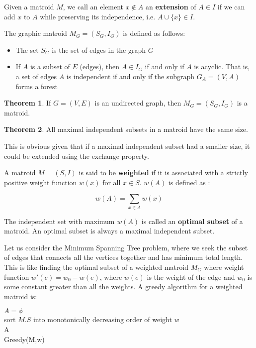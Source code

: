 \documentclass[12pt,letterpaper]{article}
\theoremstyle{definition}
\newtheorem{theorem}{Theorem}[section] %
\begin{document}
Given a matroid $M$, we call an element $x \notin A$ an \textbf{extension} of $A \in I$ if we can add $x$ to $A$ while preserving its independence, i.e. $A \cup \{x\} \in I$.

The graphic matroid $M_G = (S_G, I_G)$ is defined as follows:

\begin{itemize}
  \item The set $S_G$ is the set of edges in the graph $G$
  \item If $A$ is a subset of $E$ (edges), then $A \in I_G$ if and only if $A$ is acyclic. That is, a set of edges $A$ is independent if and only if the subgraph $G_A = (V,A)$ forms a forest
\end{itemize}

\begin{theorem}
  If $G = (V,E)$ is an undirected graph, then $M_G = (S_G,I_G)$ is a matroid.
\end{theorem}

\begin{theorem}
  All maximal independent subsets in a matroid have the same size.
\end{theorem}

This is obvious given that if a maximal independent subset had a smaller size, it could be extended using the exchange property.

A matroid $M = (S,I)$ is said to be \textbf{weighted} if it is associated with a strictly positive weight function $w(x)$ for all $x \in S$. $w(A)$ is defined as :

\[w(A) = \sum_{x \in A} w(x)\]

The independent set with maximum $w(A)$ is called an \textbf{optimal subset} of a matroid. An optimal subset is always a maximal independent subset.

Let us consider the Minimum Spanning Tree problem, where we seek the subset of edges that connects all the vertices together and has minimum total length. This is like finding the optimal subset of a weighted matroid $M_G$ where weight function $w'(e) = w_0 - w(e)$, where $w(e)$ is the weight of the edge and $w_0$ is some constant greater than all the weights. A greedy algorithm for a weighted matroid is:

\begin{algorithm}[H]
  \SetAlgoLined
  $A = \phi$ \\
  sort $M.S$ into monotonically decreasing order of weight $w$  \\
  \Return A \\
  \caption{Greedy(M,w)}
\end{algorithm}
\end{document}
